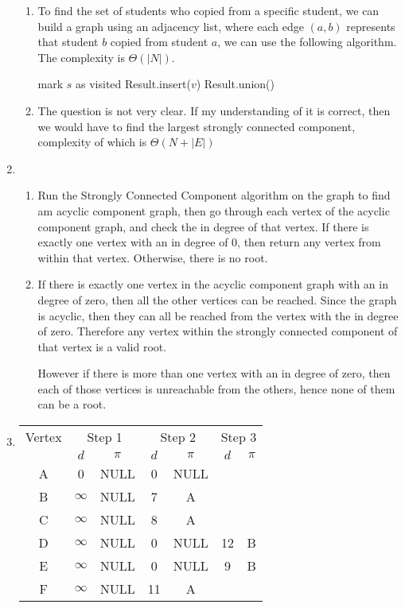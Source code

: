 \documentclass[fleqn]{article}
\begin{document}
\begin{enumerate}
\begin{enumerate}
		\item %
		To find the set of students who copied from a specific student, we can build a graph using an adjacency list, where each edge \((a, b)\) represents that student \(b\) copied from student \(a\), we can use the following algorithm. The complexity is \(\Theta(|N|)\).
		\begin{algorithmic}[1]
				\State mark \(s\) as visited
						\State Result.insert(\(v\))
						\State Result.union()
					\EndIf
				\EndFor
			\EndFunction
		\end{algorithmic}

		\item %
		The question is not very clear. If my understanding of it is correct, then we would have to find the largest strongly connected component, complexity of which is \(\Theta(N + |E|)\)
	\end{enumerate}

	\item %
	\begin{enumerate}
		\item %
		Run the Strongly Connected Component algorithm on the graph to find am acyclic component graph, then go through each vertex of the acyclic component graph, and check the in degree of that vertex. If there is exactly one vertex with an in degree of 0, then return any vertex from within that vertex. Otherwise, there is no root.
		
		\item %
		If there is exactly one vertex in the acyclic component graph with an in degree of zero, then all the other vertices can be reached. Since the graph is acyclic, then they can all be reached from the vertex with the in degree of zero. Therefore any vertex within the strongly connected component of that vertex is a valid root.

		However if there is more than one vertex with an in degree of zero, then each of those vertices is unreachable from the others, hence none of them can be a root.
	\end{enumerate}

	\item %
	\begin{tabular}{||c||c|c|c|c|c|c||}
		\hline
		Vertex & \multicolumn{2}{c|}{Step 1} & \multicolumn{2}{c|}{Step 2} & \multicolumn{2}{c||}{Step 3} \\
		& \(d\) & \(\pi\) & \(d\) & \(\pi\) & \(d\) & \(\pi\) \\
		\hline
		A & 0 			& NULL & 0	& NULL	& \\
		B & \(\infty\) 	& NULL & 7	& A		& \\
		C & \(\infty\) 	& NULL & 8	& A		& \\
		D & \(\infty\) 	& NULL & 0	& NULL	& 12	& B\\
		E & \(\infty\) 	& NULL & 0	& NULL	& 9		& B\\
		F & \(\infty\) 	& NULL & 11	& A		& 
	\end{tabular}

\end{enumerate}
    
\end{document}
